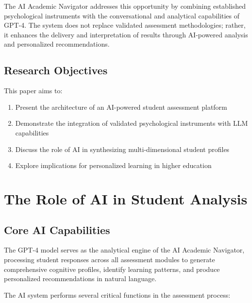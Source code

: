 \documentclass[11pt,a4paper]{article}
\begin{document}
The AI Academic Navigator addresses this opportunity by combining established psychological instruments with the conversational and analytical capabilities of GPT-4. The system does not replace validated assessment methodologies; rather, it enhances the delivery and interpretation of results through AI-powered analysis and personalized recommendations.

\subsection{Research Objectives}

This paper aims to:
\begin{enumerate}[noitemsep]
    \item Present the architecture of an AI-powered student assessment platform
    \item Demonstrate the integration of validated psychological instruments with LLM capabilities
    \item Discuss the role of AI in synthesizing multi-dimensional student profiles
    \item Explore implications for personalized learning in higher education
\end{enumerate}

\section{The Role of AI in Student Analysis}

\subsection{Core AI Capabilities}

The GPT-4 model serves as the analytical engine of the AI Academic Navigator, processing student responses across all assessment modules to generate comprehensive cognitive profiles, identify learning patterns, and produce personalized recommendations in natural language.

The AI system performs several critical functions in the assessment process:
\end{document}
